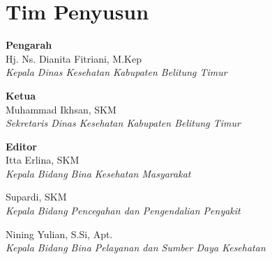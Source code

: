 {}

\section*{Tim Penyusun}
{\parindent0pt
\textbf{Pengarah}\\
\smallskip
Hj. Ns. Dianita Fitriani, M.Kep\\
\emph{Kepala Dinas Kesehatan Kabupaten Belitung Timur}
\bigskip{}

\textbf{Ketua}\\
\smallskip
Muhammad Ikhsan, SKM\\
\emph{Sekretaris Dinas Kesehatan Kabupaten Belitung Timur}
\bigskip{}


\textbf{Editor}\\
\smallskip
Itta Erlina, SKM\\
\emph{Kepala Bidang Bina Kesehatan Masyarakat}
\smallskip

Supardi, SKM\\
\emph{Kepala Bidang Pencegahan dan Pengendalian Penyakit}
\smallskip

Nining Yulian, S.Si, Apt.\\
\emph{Kepala Bidang Bina Pelayanan dan Sumber Daya Kesehatan}
\bigskip

}
